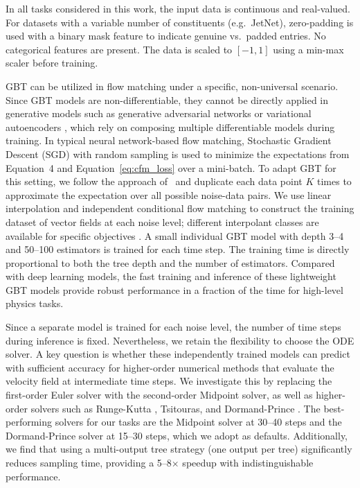 \documentclass[%
 reprint,
 amsmath,amssymb,
 aps,
prd,
floatfix,
]{revtex4-2}
\begin{document}
In all tasks considered in this work, the input data is continuous and real-valued. For datasets with a variable number of constituents (e.g.\ JetNet), zero-padding is used with a binary mask feature to indicate genuine vs.\ padded entries. No categorical features are present. The data is scaled to $[-1, 1]$ using a min-max scaler before training.

GBT can be utilized in flow matching under a specific, non-universal scenario. Since GBT models are non-differentiable, they cannot be directly applied in generative models such as generative adversarial networks \cite{gan0} or variational autoencoders \cite{vae0}, which rely on composing multiple differentiable models during training. In typical neural network-based flow matching, Stochastic Gradient Descent (SGD) \cite{sgd} with random sampling is used to minimize the expectations from Equation~4 and Equation~\ref{eq:cfm_loss} over a mini-batch. To adapt GBT for this setting, we follow the approach of~\cite{flowbdt} and duplicate each data point $K$ times to approximate the expectation over all possible noise-data pairs. We use linear interpolation and independent conditional flow matching to construct the training dataset of vector fields at each noise level; different interpolant classes are available for specific objectives \cite{cfm,sbcfm}. A small individual GBT model with depth 3--4 and 50--100 estimators is trained for each time step. The training time is directly proportional to both the tree depth and the number of estimators. Compared with deep learning models, the fast training and inference of these lightweight GBT models provide robust performance in a fraction of the time for high-level physics tasks.

Since a separate model is trained for each noise level, the number of time steps during inference is fixed. Nevertheless, we retain the flexibility to choose the ODE solver. A key question is whether these independently trained models can predict with sufficient accuracy for higher-order numerical methods that evaluate the velocity field at intermediate time steps. We investigate this by replacing the first-order Euler solver with the second-order Midpoint solver, as well as higher-order solvers such as Runge-Kutta \cite{rk}, Tsitouras, and Dormand-Prince \cite{dpori}. The best-performing solvers for our tasks are the Midpoint solver at 30--40 steps and the Dormand-Prince solver at 15--30 steps, which we adopt as defaults. Additionally, we find that using a multi-output tree strategy (one output per tree) significantly reduces sampling time, providing a 5--8$\times$ speedup with indistinguishable performance.
\end{document}
